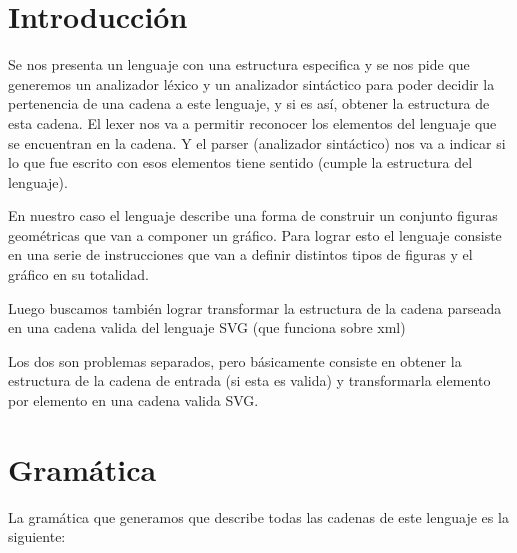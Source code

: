 \documentclass{article}
\theoremstyle{definition}
\theoremstyle{remark}
\begin{document}
{} %

\grupo{}


\maketitle

\pagebreak

\tableofcontents

\pagebreak

\section{Introducción}
Se nos presenta un lenguaje con una estructura especifica y se nos pide que generemos un analizador léxico y un analizador sintáctico para poder decidir la pertenencia de una cadena a este lenguaje, y si es así, obtener la estructura de esta cadena.
El lexer nos va a permitir reconocer los elementos del lenguaje que se encuentran en la cadena. Y el parser (analizador sintáctico) nos va a indicar si lo que fue escrito con esos elementos tiene sentido (cumple la estructura del lenguaje).

En nuestro caso el lenguaje describe una forma de construir un conjunto figuras geométricas que van a componer un gráfico. Para lograr esto el lenguaje consiste en una serie de instrucciones que van a definir distintos tipos de figuras y el gráfico en su totalidad.

Luego buscamos también lograr transformar la estructura de la cadena parseada en una cadena valida del lenguaje SVG (que funciona sobre xml)

Los dos son problemas separados, pero básicamente consiste en obtener la estructura de la cadena de entrada (si esta es valida) y transformarla elemento por elemento en una cadena valida SVG.

\section{Gramática}
La gramática que generamos que describe todas las cadenas de este lenguaje es la siguiente:
\end{document}

